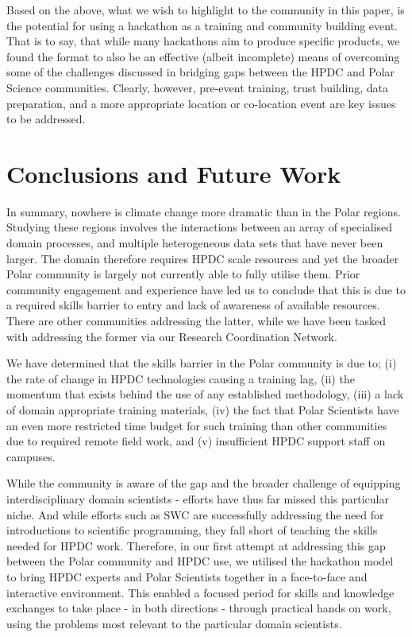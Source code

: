 \documentclass[conference]{IEEEtran}
\begin{document}
Based on the above, what we wish to highlight to the community in this paper, is the potential for using a hackathon as a training and community building event.  That is to say, that while many hackathons aim to produce specific products, we found the format to also be an effective (albeit incomplete) means of overcoming some of the challenges discussed in bridging gaps between the HPDC and Polar Science communities.  Clearly, however, pre-event training, trust building, data preparation, and a more appropriate location or co-location event are key issues to be addressed. 

\section{Conclusions and Future Work}
In summary, nowhere is climate change more dramatic than in the Polar regions.  Studying these regions involves the interactions between an array of specialised domain processes, and multiple heterogeneous data sets that have never been larger.  The domain therefore requires HPDC scale resources and yet the broader Polar community is largely not currently able to fully utilise them.  Prior community engagement and experience have led us to conclude that this is due to a required skills barrier to entry and lack of awareness of available resources.  There are other communities addressing the latter, while we have been tasked with addressing the former via our Research Coordination Network.

We have determined that the skills barrier in the Polar community is due to; (i) the rate of change in HPDC technologies causing a training lag, (ii) the momentum that exists behind the use of any established methodology, (iii) a lack of domain appropriate training materials, (iv) the fact that Polar Scientists have an even more restricted time budget for such training than other communities due to required remote field work, and (v) insufficient HPDC support staff on campuses.

While the community is aware of the gap and the broader challenge of equipping interdisciplinary domain scientists - efforts have thus far missed this particular niche.  And while efforts such as SWC are successfully addressing the need for introductions to scientific programming, they fall short of teaching the skills needed for HPDC work.  Therefore, in our first attempt at addressing this gap between the Polar community and HPDC use, we utilised the hackathon model to bring HPDC experts and Polar Scientists together in a face-to-face and interactive environment.  This enabled a focused period for skills and knowledge exchanges to take place - in both directions - through practical hands on work, using the problems most relevant to the particular domain scientists.  
\end{document}
